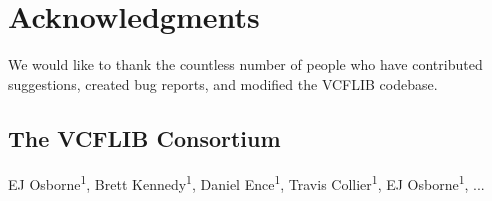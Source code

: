 \documentclass[10pt,letterpaper]{article}
\begin{document}
\section*{Acknowledgments}

We would like to thank the countless number of people who have contributed suggestions, created bug reports, and modified the VCFLIB codebase.  

\subsection*{The VCFLIB Consortium}

EJ Osborne\textsuperscript{1},
Brett Kennedy\textsuperscript{1},
Daniel Ence\textsuperscript{1},
Travis Collier\textsuperscript{1},
EJ Osborne\textsuperscript{1},
...
\nolinenumbers
\end{document}
